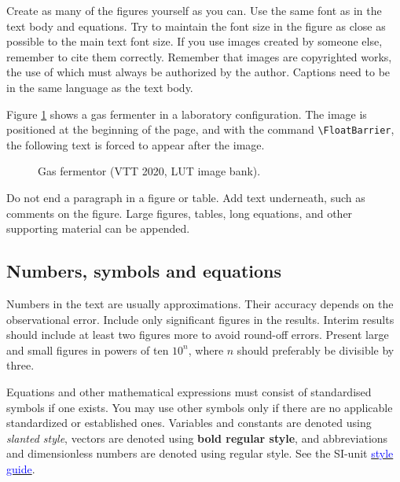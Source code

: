 Create as many of the figures yourself as you can. Use the same font as in the text body and equations. Try to maintain the font size in the figure as close as possible to the main text font size. If you use images created by someone else, remember to cite them correctly. Remember that images are copyrighted works, the use of which must always be authorized by the author. Captions need to be in the same language as the text body.

Figure \ref{fig:2} shows a gas fermenter in a laboratory configuration. The image is positioned at the beginning of the page, and with the command \verb|\FloatBarrier|, the following text is forced to appear after the image.

\begin{figure}[t]
   \centering
    \caption[Short description for List of Figures]{Gas fermentor (VTT 2020, LUT image bank).}
    \label{fig:2}
\end{figure}
\FloatBarrier

Do not end a paragraph in a figure or table. Add text underneath, such as comments on the figure. Large figures, tables, long equations, and other supporting material can be appended.

\subsection*{Numbers, symbols and equations}

Numbers in the text are usually approximations. Their accuracy depends on the observational error. Include only significant figures in the results. Interim results should include at least two figures more to avoid round-off errors. Present large and small figures in powers of ten $10^n$, where $n$ should preferably be divisible by three.

Equations and other mathematical expressions must consist of standardised symbols if one exists. You may use other symbols only if there are no applicable standardized or established ones. Variables and constants are denoted using \textit{slanted style}, vectors are denoted using \textbf{bold regular style}, and abbreviations and dimensionless numbers are denoted using regular style. See the SI-unit \href{https://physics.nist.gov/cuu/Units/checklist.html}{\textcolor{blue}{style guide}}.


